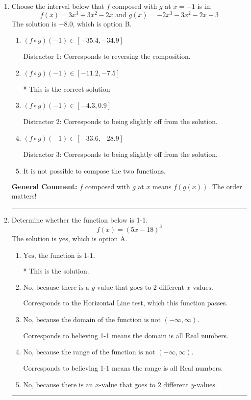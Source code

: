 \documentclass{extbook}[14pt]
\newcommand{\litem}[1]{\item #1

\rule{\textwidth}{0.4pt}}
\begin{document}
\begin{enumerate}\litem{
Choose the interval below that $f$ composed with $g$ at $x=-1$ is in.
\[ f(x) = 3x^{3} +3 x^{2} -2 x \text{ and } g(x) = -2x^{3} -3 x^{2} -2 x -3 \]The solution is \( -8.0 \), which is option B.\begin{enumerate}[label=\Alph*.]
\item \( (f \circ g)(-1) \in [-35.4, -34.9] \)

 Distractor 1: Corresponds to reversing the composition.
\item \( (f \circ g)(-1) \in [-11.2, -7.5] \)

* This is the correct solution
\item \( (f \circ g)(-1) \in [-4.3, 0.9] \)

 Distractor 2: Corresponds to being slightly off from the solution.
\item \( (f \circ g)(-1) \in [-33.6, -28.9] \)

 Distractor 3: Corresponds to being slightly off from the solution.
\item \( \text{It is not possible to compose the two functions.} \)


\end{enumerate}

\textbf{General Comment:} $f$ composed with $g$ at $x$ means $f(g(x))$. The order matters!
}
\litem{
Determine whether the function below is 1-1.
\[ f(x) = (5 x - 18)^3 \]The solution is \( \text{yes} \), which is option A.\begin{enumerate}[label=\Alph*.]
\item \( \text{Yes, the function is 1-1.} \)

* This is the solution.
\item \( \text{No, because there is a $y$-value that goes to 2 different $x$-values.} \)

Corresponds to the Horizontal Line test, which this function passes.
\item \( \text{No, because the domain of the function is not $(-\infty, \infty)$.} \)

Corresponds to believing 1-1 means the domain is all Real numbers.
\item \( \text{No, because the range of the function is not $(-\infty, \infty)$.} \)

Corresponds to believing 1-1 means the range is all Real numbers.
\item \( \text{No, because there is an $x$-value that goes to 2 different $y$-values.} \)


\end{enumerate}}
\end{enumerate}
\end{document}
